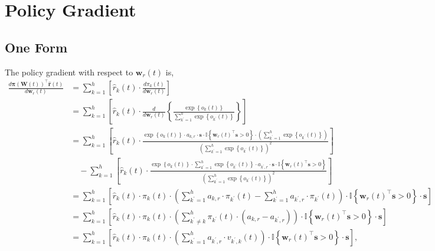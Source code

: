 \documentclass[10pt]{article}
\def\rvr{{\mathbf{r}}}
\def\rvs{{\mathbf{s}}}
\def\rvw{{\mathbf{w}}}
\def\rvpi{{\boldsymbol{\pi}}}
\def\rmW{{\mathbf{W}}}
\def\sI{{\mathbb{I}}}
\begin{document}
\section{Policy Gradient}

\subsection{One Form}

The policy gradient with respect to $\rvw_r(t)$ is,
\begin{equation}
\label{eq:gradient_form_one}
\begin{split}
	\frac{d \rvpi\left( \rmW(t) \right)^\top \hat{\rvr}\left(t\right)}{d \rvw_r(t)} &=  \sum\limits_{k=1}^{h}\left[ \hat{r}_k\left(t\right) \cdot \frac{d \pi_k(t)}{d \rvw_r(t)} \right]  \\
	&= \sum\limits_{k=1}^{h}\left[ \hat{r}_k\left(t\right) \cdot \frac{d}{d \rvw_r(t)} \left\{ \frac{\exp\left\{ o_k(t) \right\}}{\sum\limits_{k^\prime = 1}^{h}{\exp\left\{ o_{k^\prime}(t) \right\}}} \right\} \right] \\
	&= \sum\limits_{k=1}^{h}\left[ \hat{r}_k\left(t\right) \cdot \frac{ \exp\left\{ o_k(t) \right\} \cdot a_{k,r} \cdot \rvs \cdot \sI\left\{ \rvw_r(t)^\top \rvs > 0 \right\} \cdot \left( \sum\limits_{k^\prime = 1}^{h}{\exp\left\{ o_{k^\prime}(t) \right\}} \right) }{ \left( \sum\limits_{k^\prime = 1}^{h}{\exp\left\{ o_{k^\prime}(t) \right\}} \right)^2 } \right] \\
	&\quad -\sum\limits_{k=1}^{h}\left[ \hat{r}_k\left(t\right) \cdot \frac{ \exp\left\{ o_k(t) \right\} \cdot \sum\limits_{k^\prime = 1}^{h}{\exp\left\{ o_{k^\prime}(t) \right\}} \cdot a_{k^\prime,r} \cdot \rvs \cdot \sI\left\{ \rvw_r(t)^\top \rvs > 0 \right\} }{ \left( \sum\limits_{k^\prime = 1}^{h}{\exp\left\{ o_{k^\prime}(t) \right\}} \right)^2 } \right] \\
	&= \sum\limits_{k=1}^{h}{ \left[ \hat{r}_k\left(t\right) \cdot \pi_k(t) \cdot \left( \sum\limits_{k^\prime = 1}^{h}{ a_{k,r} \cdot \pi_{k^\prime}(t) } - \sum\limits_{k^\prime = 1}^{h}{ a_{k^\prime,r} \cdot \pi_{k^\prime}(t) } \right) \cdot \sI\left\{ \rvw_r(t)^\top \rvs > 0 \right\} \cdot \rvs \right] } \\
	&= \sum\limits_{k=1}^{h}{ \left[ \hat{r}_k\left(t\right) \cdot \pi_k(t) \cdot \left( \sum\limits_{k^\prime \not= k}^{h}{ \pi_{k^\prime}(t) \cdot \left( a_{k,r} - a_{k^\prime,r} \right)  } \right) \cdot \sI\left\{ \rvw_r(t)^\top \rvs > 0 \right\} \cdot \rvs \right] } \\
	&= \sum\limits_{k=1}^{h}{ \left[ \hat{r}_k\left(t\right) \cdot \pi_k(t) \cdot \left( \sum\limits_{k^\prime = 1}^{h}{ a_{k^\prime,r}  \cdot v_{k^\prime,k}(t) } \right) \cdot \sI\left\{ \rvw_r(t)^\top \rvs > 0 \right\} \cdot \rvs \right] },
\end{split}
\end{equation}
\end{document}
